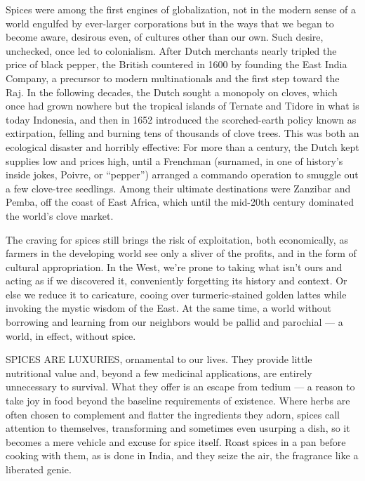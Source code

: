 Spices were among the first engines of globalization, not in the modern
sense of a world engulfed by ever-larger corporations but in the ways
that we began to become aware, desirous even, of cultures other than our
own. Such desire, unchecked, once led to colonialism. After Dutch
merchants nearly tripled the price of black pepper, the British
countered in 1600 by founding the East India Company, a precursor to
modern multinationals and the first step toward the Raj. In the
following decades, the Dutch sought a monopoly on cloves, which once had
grown nowhere but the tropical islands of Ternate and Tidore in what is
today Indonesia, and then in 1652 introduced the scorched-earth policy
known as extirpation, felling and burning tens of thousands of clove
trees. This was both an ecological disaster and horribly effective: For
more than a century, the Dutch kept supplies low and prices high, until
a Frenchman (surnamed, in one of history's inside jokes, Poivre, or
``pepper'') arranged a commando operation to smuggle out a few
clove-tree seedlings. Among their ultimate destinations were Zanzibar
and Pemba, off the coast of East Africa, which until the mid-20th
century dominated the world's clove market.

The craving for spices still brings the risk of exploitation, both
economically, as farmers in the developing world see only a sliver of
the profits, and in the form of cultural appropriation. In the West,
we're prone to taking what isn't ours and acting as if we discovered it,
conveniently forgetting its history and context. Or else we reduce it to
caricature, cooing over turmeric-stained golden lattes while invoking
the mystic wisdom of the East. At the same time, a world without
borrowing and learning from our neighbors would be pallid and parochial
--- a world, in effect, without spice.

SPICES ARE LUXURIES, ornamental to our lives. They provide little
nutritional value and, beyond a few medicinal applications, are entirely
unnecessary to survival. What they offer is an escape from tedium --- a
reason to take joy in food beyond the baseline requirements of
existence. Where herbs are often chosen to complement and flatter the
ingredients they adorn, spices call attention to themselves,
transforming and sometimes even usurping a dish, so it becomes a mere
vehicle and excuse for spice itself. Roast spices in a pan before
cooking with them, as is done in India, and they seize the air, the
fragrance like a liberated genie.

